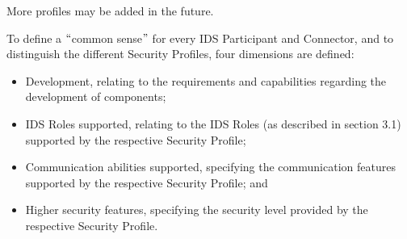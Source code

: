More profiles may be added in the future.

To define a $``$common sense$"$  for every IDS Participant and Connector, and to distinguish the different Security Profiles, four dimensions are defined:


\begin{itemize}
	\item Development, relating to the requirements and capabilities regarding the development of components;

	\item IDS Roles supported, relating to the IDS Roles (as described in section 3.1) supported by the respective Security Profile;

	\item Communication abilities supported, specifying the communication features supported by the respective Security Profile; and

	\item Higher security features, specifying the security level provided by the respective Security Profile. 
\end{itemize}






